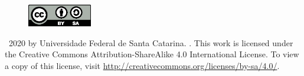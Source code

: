 \vfill

\begin{figure}[!h]
	\begin{center}
		\includegraphics[width=0.25\textwidth]{figures/by-sa.eps}
	\end{center}
\end{figure}

\textcopyright\  2020 by Universidade Federal de Santa Catarina. \thetitle. This work is licensed under the Creative Commons Attribution-ShareAlike 4.0 International License. To view a copy of this license, visit \href{http://creativecommons.org/licenses/by-sa/4.0/}{http://creativecommons.org/licenses/by-sa/4.0/}.

